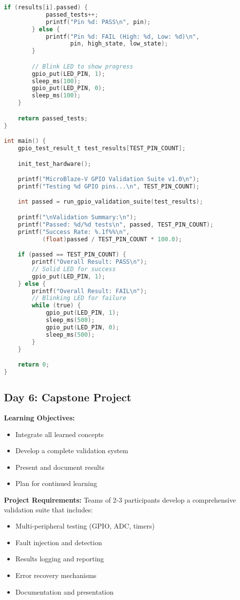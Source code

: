 \documentclass[11pt,a4paper]{article}
\begin{document}
\begin{lstlisting}[language=C, caption=Day 5 Example: GPIO Validation Test]
        if (results[i].passed) {
            passed_tests++;
            printf("Pin %d: PASS\n", pin);
        } else {
            printf("Pin %d: FAIL (High: %d, Low: %d)\n",
                   pin, high_state, low_state);
        }

        // Blink LED to show progress
        gpio_put(LED_PIN, 1);
        sleep_ms(100);
        gpio_put(LED_PIN, 0);
        sleep_ms(100);
    }

    return passed_tests;
}

int main() {
    gpio_test_result_t test_results[TEST_PIN_COUNT];

    init_test_hardware();

    printf("MicroBlaze-V GPIO Validation Suite v1.0\n");
    printf("Testing %d GPIO pins...\n", TEST_PIN_COUNT);

    int passed = run_gpio_validation_suite(test_results);

    printf("\nValidation Summary:\n");
    printf("Passed: %d/%d tests\n", passed, TEST_PIN_COUNT);
    printf("Success Rate: %.1f%%\n",
           (float)passed / TEST_PIN_COUNT * 100.0);

    if (passed == TEST_PIN_COUNT) {
        printf("Overall Result: PASS\n");
        // Solid LED for success
        gpio_put(LED_PIN, 1);
    } else {
        printf("Overall Result: FAIL\n");
        // Blinking LED for failure
        while (true) {
            gpio_put(LED_PIN, 1);
            sleep_ms(500);
            gpio_put(LED_PIN, 0);
            sleep_ms(500);
        }
    }

    return 0;
}
\end{lstlisting}

\subsection{Day 6: Capstone Project}

\textbf{Learning Objectives:}
\begin{itemize}
    \item Integrate all learned concepts
    \item Develop a complete validation system
    \item Present and document results
    \item Plan for continued learning
\end{itemize}

\textbf{Project Requirements:}
Teams of 2-3 participants develop a comprehensive validation suite that includes:
\begin{itemize}
    \item Multi-peripheral testing (GPIO, ADC, timers)
    \item Fault injection and detection
    \item Results logging and reporting
    \item Error recovery mechanisms
    \item Documentation and presentation
\end{itemize}
\end{document}
